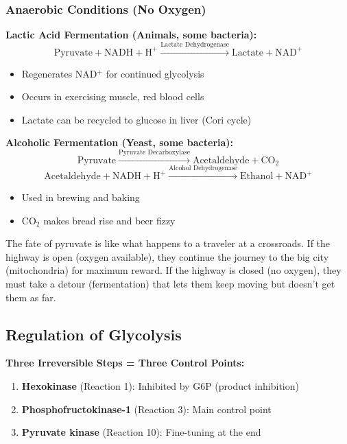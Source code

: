 \subsubsection{Anaerobic Conditions (No Oxygen)}

\textbf{Lactic Acid Fermentation (Animals, some bacteria):}
\[
\text{Pyruvate} + \text{NADH} + \text{H}^+ \xrightarrow{\text{Lactate Dehydrogenase}} \text{Lactate} + \text{NAD}^+
\]

\begin{itemize}
    \item Regenerates NAD$^+$ for continued glycolysis
    \item Occurs in exercising muscle, red blood cells
    \item Lactate can be recycled to glucose in liver (Cori cycle)
\end{itemize}

\textbf{Alcoholic Fermentation (Yeast, some bacteria):}
\[
\text{Pyruvate} \xrightarrow{\text{Pyruvate Decarboxylase}} \text{Acetaldehyde} + \text{CO}_2
\]
\[
\text{Acetaldehyde} + \text{NADH} + \text{H}^+ \xrightarrow{\text{Alcohol Dehydrogenase}} \text{Ethanol} + \text{NAD}^+
\]

\begin{itemize}
    \item Used in brewing and baking
    \item CO$_2$ makes bread rise and beer fizzy
\end{itemize}

\begin{analogy}
The fate of pyruvate is like what happens to a traveler at a crossroads. If the highway is open (oxygen available), they continue the journey to the big city (mitochondria) for maximum reward. If the highway is closed (no oxygen), they must take a detour (fermentation) that lets them keep moving but doesn't get them as far.
\end{analogy}

\subsection{Regulation of Glycolysis}

\begin{theorem}
\textbf{Three Irreversible Steps = Three Control Points:}
\begin{enumerate}
    \item \textbf{Hexokinase} (Reaction 1): Inhibited by G6P (product inhibition)
    \item \textbf{Phosphofructokinase-1} (Reaction 3): Main control point
    \item \textbf{Pyruvate kinase} (Reaction 10): Fine-tuning at the end
\end{enumerate}
\end{theorem}

